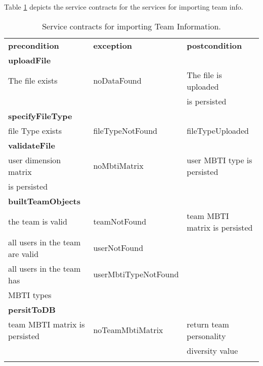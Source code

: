 Table \ref{tab:teaminfoimport} depicts the service contracts for the services for importing team info.

\begin{table}[htb]
\caption{Service contracts for importing Team Information. \label{tab:teaminfoimport}}

\begin{tabular}{l l l}
\hline
\noalign{\smallskip}
\textbf{precondition}&\textbf{exception} &\textbf{postcondition}\\
\noalign{\smallskip}
\hline
\noalign{\smallskip}
\textbf{uploadFile}\\
The file exists & noDataFound & The file is uploaded \\
&&is persisted \\
\noalign{\smallskip}
\textbf{specifyFileType}\\
file Type exists & fileTypeNotFound & fileTypeUploaded\\
\noalign{\smallskip}

\textbf{validateFile}\\
user dimension matrix & noMbtiMatrix & user MBTI type is persisted\\
is persisted \\

\noalign{\smallskip}
\textbf{builtTeamObjects} \\
the team is valid & teamNotFound & team MBTI matrix is persisted \\
all users in the team are valid & userNotFound\\
all users in the team has & userMbtiTypeNotFound\\
MBTI types \\
\noalign{\smallskip}
\textbf{persitToDB}\\
team MBTI matrix is persisted & noTeamMbtiMatrix & return team personality \\
&&diversity value\\
\noalign{\smallskip}
\hline
\end{tabular}  
\end{table}
 